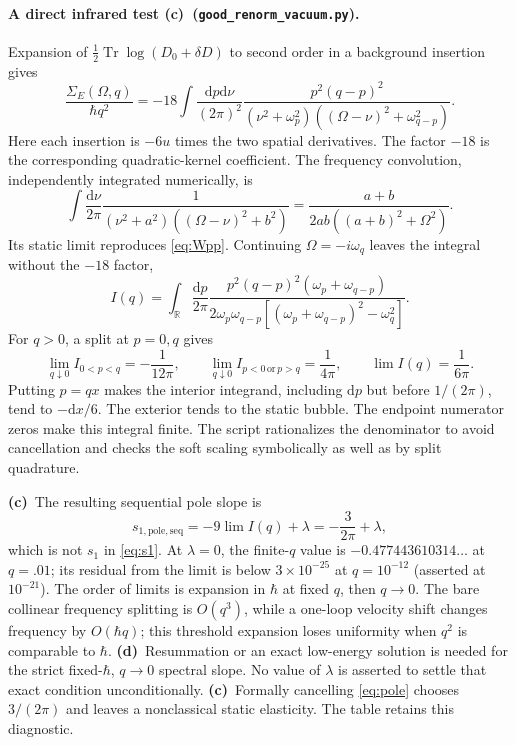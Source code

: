 \documentclass[11pt,a4paper]{article}
\newcommand{\C}{\textbf{(c)}\ }
\newcommand{\D}{\textbf{(d)}\ }
\newcommand{\dd}{\mathrm d}
\newcommand{\file}[1]{\nolinkurl{#1}}
\newcommand{\vac}{\file{good_renorm_vacuum.py}}
\begin{document}
\paragraph{A direct infrared test \C (\vac).}
Expansion of $\frac12\operatorname{Tr}\log(D_0+\delta D)$ to second order
in a background insertion gives
\begin{equation}
 \frac{\Sigma_E(\Omega,q)}{\hbar q^2}
 =-18\int\frac{\dd p\dd\nu}{(2\pi)^2}
 \frac{p^2(q-p)^2}{(\nu^2+\omega_p^2)
 ((\Omega-\nu)^2+\omega_{q-p}^2)}.\label{eq:bubble}
\end{equation}
Here each insertion is $-6u$ times the two spatial derivatives. The factor
$-18$ is the corresponding quadratic-kernel coefficient.
The frequency convolution, independently integrated numerically, is
\begin{equation}
 \int\frac{\dd\nu}{2\pi}
 \frac1{(\nu^2+a^2)((\Omega-\nu)^2+b^2)}
 =\frac{a+b}{2ab((a+b)^2+\Omega^2)}.
\end{equation}
Its static limit reproduces \eqref{eq:Wpp}. Continuing
$\Omega=-i\omega_q$ leaves the integral without the $-18$ factor,
\begin{equation}
 I(q)=\int_{\mathbb R}\frac{\dd p}{2\pi}
 \frac{p^2(q-p)^2(\omega_p+\omega_{q-p})}
 {2\omega_p\omega_{q-p}[(\omega_p+\omega_{q-p})^2-\omega_q^2]}.
\end{equation}
For $q>0$, a split at $p=0,q$ gives
\begin{equation}
 \lim_{q\downarrow0}I_{0<p<q}=-\frac1{12\pi},\qquad
 \lim_{q\downarrow0}I_{p<0\,\text{or}\,p>q}=\frac1{4\pi},\qquad
 \lim I(q)=\frac1{6\pi}.\label{eq:soft}
\end{equation}
Putting $p=qx$ makes the interior integrand, including $\dd p$ but before
$1/(2\pi)$, tend to $-\dd x/6$. The exterior tends to the static bubble.
The endpoint numerator zeros make this integral finite. The script
rationalizes the denominator to avoid cancellation and checks the soft
scaling symbolically as well as by split quadrature.

\C The resulting sequential pole slope is
\begin{equation}
 s_{1,\mathrm{pole,seq}}=-9\lim I(q)+\lambda
 =-\frac3{2\pi}+\lambda,\label{eq:pole}
\end{equation}
which is not $s_1$ in \eqref{eq:s1}. At $\lambda=0$, the finite-$q$
value is $-0.477443610314\ldots$ at $q=.01$; its residual from the limit
is below $3\times10^{-25}$ at $q=10^{-12}$ (asserted at $10^{-21}$).
The order of limits is expansion in $\hbar$ at fixed $q$, then $q\to0$.
The bare collinear frequency splitting is $O(q^3)$, while a one-loop
velocity shift changes frequency by $O(\hbar q)$; this threshold expansion
loses uniformity when $q^2$ is comparable to $\hbar$.
\D Resummation or an exact low-energy solution is needed for the strict
fixed-$\hbar$, $q\to0$ spectral slope. No value of $\lambda$ is asserted
to settle that exact condition unconditionally.
\C Formally cancelling \eqref{eq:pole} chooses $3/(2\pi)$ and leaves a
nonclassical static elasticity. The table retains this diagnostic.
\end{document}
